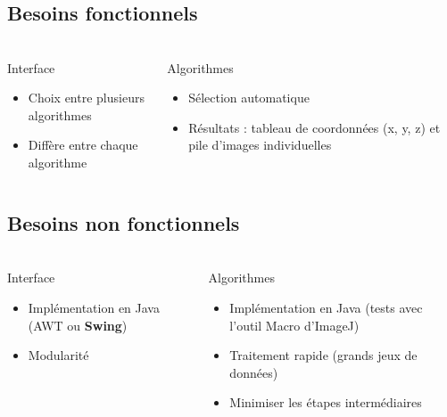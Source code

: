 \documentclass[11pt]{beamer}
\begin{document}
\subsection{Besoins fonctionnels}
\begin{frame}
\frametitle{\subsecname}
	\begin{columns}[t]
		
		\begin{column}{5cm}
			\begin{block}{Interface}
				\begin{itemize}
					\item Choix entre plusieurs algorithmes
					\item Diffère entre chaque algorithme
				\end{itemize}
			\end{block}
		\end{column}
		\begin{column}{5cm}
			\begin{block}{Algorithmes}
				\begin{itemize}
					\item Sélection automatique
					\item Résultats : tableau de coordonnées (x, y, z) et pile d'images individuelles
				\end{itemize}
			\end{block}
		\end{column}
	\end{columns}	
\end{frame}

\subsection{Besoins non fonctionnels}
\begin{frame}
\frametitle{\subsecname}
	\begin{columns}[t]
		\begin{column}{5cm}
			\begin{block}{Interface}
				\begin{itemize}
					\item Implémentation en Java (AWT ou \textbf{Swing})
					\item Modularité
				\end{itemize}
			\end{block}
		\end{column}
		\begin{column}{5cm}
			\begin{block}{Algorithmes}
				\begin{itemize}
					\item Implémentation en Java (tests avec l'outil Macro d'ImageJ)
					\item Traitement rapide (grands jeux de données)
					\item Minimiser les étapes intermédiaires
				\end{itemize}
			\end{block}
		\end{column}
	\end{columns}
\end{frame}
\end{document}
